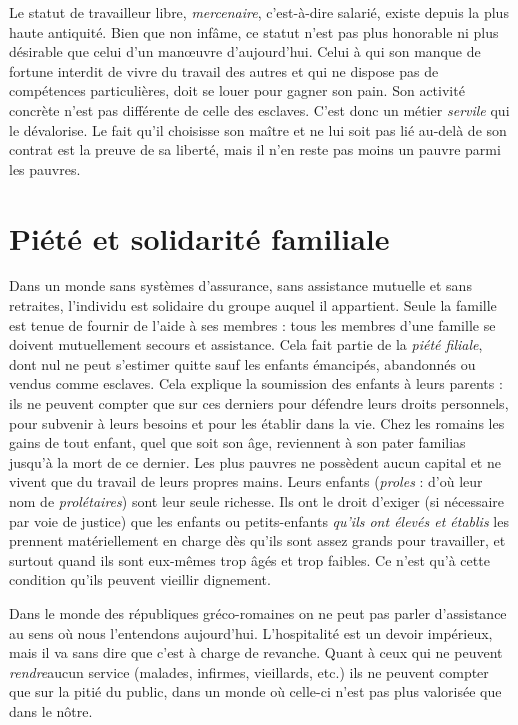  Le statut de travailleur libre, \emph{mercenaire}, c'est-à-dire salarié, existe depuis la plus haute antiquité. Bien que non infâme, ce statut n'est pas plus honorable ni plus désirable que celui d'un manœuvre d'aujourd'hui. Celui à qui son manque de fortune interdit de vivre du travail des autres et qui ne dispose pas de compétences particulières, doit se louer pour gagner son pain. Son activité concrète n'est pas différente de celle des esclaves. C'est donc un métier \emph{servile} qui le dévalorise. Le fait qu'il choisisse son maître et ne lui soit pas lié au-delà de son contrat est la preuve de sa liberté, mais il n'en reste pas moins un pauvre parmi les pauvres. 


\section{Piété et solidarité familiale}

 Dans un monde sans systèmes d'assurance, sans assistance mutuelle et sans retraites, l'individu est solidaire du groupe auquel il appartient. Seule la famille est tenue de fournir de l'aide à ses membres : tous les membres d'une famille se doivent mutuellement secours et assistance. Cela fait partie de la \emph{piété filiale}, dont nul ne peut s'estimer quitte sauf les enfants émancipés, abandonnés ou vendus comme esclaves. Cela explique la soumission des enfants à leurs parents : ils ne peuvent compter que sur ces derniers pour défendre leurs droits personnels, pour subvenir à leurs besoins et pour les établir dans la vie. Chez les romains les gains de tout enfant, quel que soit son âge, reviennent à son pater familias jusqu'à la mort de ce dernier. Les plus pauvres ne possèdent aucun capital et ne vivent que du travail de leurs propres mains. Leurs enfants (\emph{proles} : d'où leur nom de \emph{prolétaires}) sont leur seule richesse. Ils ont le droit d'exiger (si nécessaire par voie de justice) que les enfants ou petits-enfants \emph{qu'ils ont élevés et établis} les prennent matériellement en charge dès qu'ils sont assez grands pour travailler, et surtout quand ils sont eux-mêmes trop âgés et trop faibles. Ce n'est qu'à cette condition qu'ils peuvent vieillir dignement. 

 Dans le monde des républiques gréco-romaines on ne peut pas parler d'assistance au sens où nous l'entendons aujourd'hui. L'hospitalité est un devoir impérieux, mais il va sans dire que c'est à charge de revanche. Quant à ceux qui ne peuvent \emph{rendre}aucun service (malades, infirmes, vieillards, etc.) ils ne peuvent compter que sur la pitié du public, dans un monde où celle-ci n'est pas plus valorisée que dans le nôtre.

